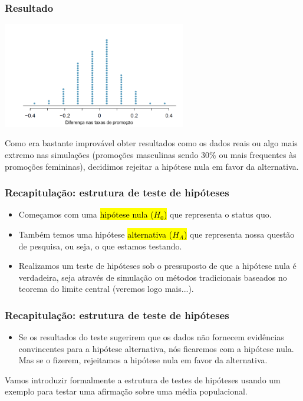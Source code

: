 
\begin{frame}
\frametitle{Resultado}

\begin{center}
\includegraphics[width=0.6\textwidth]{4-3_hyp_test/discRandDotPlot.png}
\end{center}

\pause
\justifying
Como era bastante improvável obter resultados como os dados reais ou algo mais extremo nas simulações (promoções masculinas sendo 30\% ou mais frequentes às promoções femininas), decidimos rejeitar a hipótese nula em favor da alternativa.

\end{frame}


\begin{frame}
\frametitle{Recapitulação: estrutura de teste de hipóteses}

\begin{itemize}
\justifying
\item Começamos com uma \hl{hipótese nula ($ H_0 $)} que representa o status quo.
\pause
\justifying
\item Também temos uma hipótese \hl{alternativa ($ H_A $)} que representa nossa questão de pesquisa, ou seja, o que estamos testando.
\pause
\justifying
\item Realizamos um teste de hipóteses sob o pressuposto de que a hipótese nula é verdadeira, seja através de simulação ou métodos tradicionais baseados no teorema do limite central (veremos logo mais...).
\end{itemize}
\end{frame}


\begin{frame}
\frametitle{Recapitulação: estrutura de teste de hipóteses}

\begin{itemize}
\justifying
\item Se os resultados do teste sugerirem que os dados não fornecem evidências convincentes para a hipótese alternativa, nós ficaremos com a hipótese nula. Mas se o fizerem, rejeitamos a hipótese nula em favor da alternativa.
\end{itemize}
\pause
\justifying
Vamos introduzir formalmente a estrutura de testes de hipóteses usando um exemplo para testar uma afirmação sobre uma média populacional.

\end{frame}

